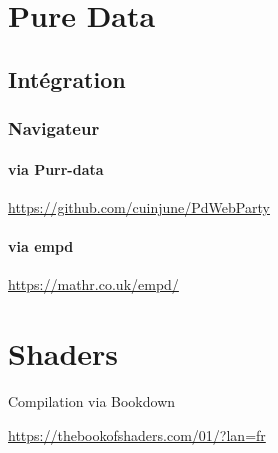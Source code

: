 \documentclass[
  french,
]{book}
\begin{document}
\hypertarget{pure-data}{%
\chapter{Pure Data}\label{pure-data}}

\hypertarget{intuxe9gration}{%
\section{Intégration}\label{intuxe9gration}}

\hypertarget{navigateur-1}{%
\subsection{Navigateur}\label{navigateur-1}}

\hypertarget{via-purr-data}{%
\subsubsection{via Purr-data}\label{via-purr-data}}

\url{https://github.com/cuinjune/PdWebParty}

\hypertarget{via-empd}{%
\subsubsection{via empd}\label{via-empd}}

\url{https://mathr.co.uk/empd/}

\hypertarget{shaders}{%
\chapter{Shaders}\label{shaders}}

Compilation via Bookdown \citep{xie2015}

\url{https://thebookofshaders.com/01/?lan=fr}

  
\end{document}
